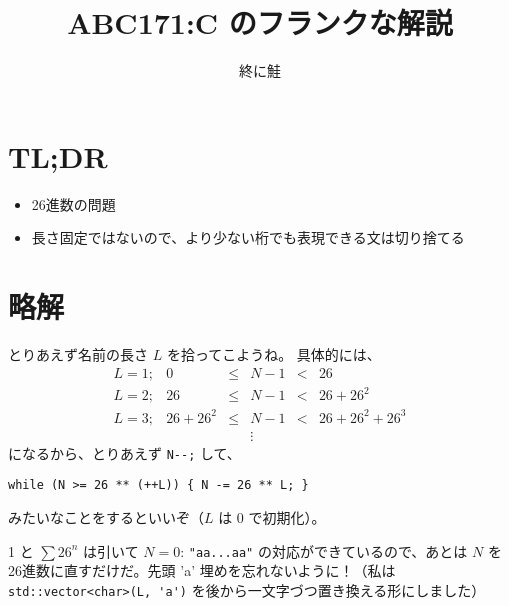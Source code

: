 \documentclass[11pt, dvipdfmx]{jarticle}
\title{ABC171:C のフランクな解説}
\author{終に鮭}
\begin{document}
\maketitle

\section*{TL;DR}

\begin{itemize}
	\item 26進数の問題
	\item 長さ固定ではないので、より少ない桁でも表現できる文は切り捨てる
\end{itemize}

\section*{略解}

とりあえず名前の長さ $L$ を拾ってこようね。
具体的には、
\[
	\begin{array}{rrcccl}
		L=1;& 0 & \leq & N-1 & < & 26 \\
		L=2;& 26 & \leq & N-1 & < & 26 + 26^2 \\
		L=3;& 26 + 26 ^ 2 & \leq & N-1 & < & 26 + 26^2 + 26^3 \\
		&&& \vdots &&
	\end{array}
\]
になるから、とりあえず \verb|N--;| して、
\begin{verbatim}
while (N >= 26 ** (++L)) { N -= 26 ** L; }
\end{verbatim}
みたいなことをするといいぞ（$L$ は 0 で初期化）。

1 と $\sum 26^n$ は引いて $N=0$: \verb|"aa...aa"| の対応ができているので、あとは $N$ を26進数に直すだけだ。先頭 'a' 埋めを忘れないように！（私は \verb|std::vector<char>(L, 'a')| を後から一文字づつ置き換える形にしました）
\end{document}
